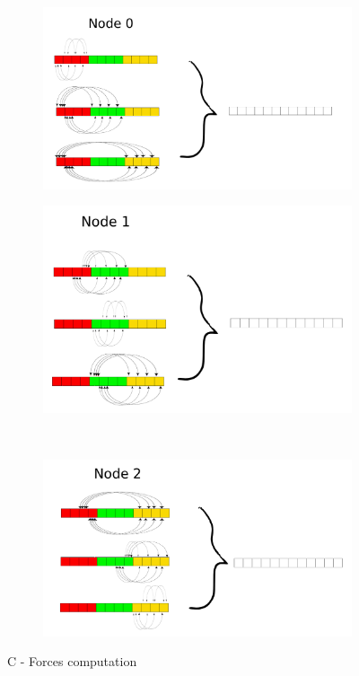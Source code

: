 \documentclass[a4paper]{article}
\begin{document}
\begin{figure}[ht]
\begin{subfigure}{.5\textwidth}
  \centering
  \includegraphics[width=1\linewidth]{force_calculation_0}
\end{subfigure} %
\begin{subfigure}{.5\textwidth}
  \centering
  \includegraphics[width=1\linewidth]{force_calculation_1}
\end{subfigure} \\ %
\begin{subfigure}{\textwidth}
  \centering
  \includegraphics[width=0.5\linewidth]{force_calculation_2}
\end{subfigure}
  \caption{C - Forces computation}
  \label{fig:C1}
\end{figure}
\FloatBarrier
\end{document}

